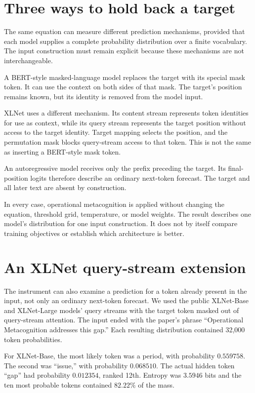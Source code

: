 \documentclass[11pt,a4paper]{article}
\begin{document}
\section{Three ways to hold back a target}
The same equation can measure different prediction mechanisms, provided that each model supplies a complete probability distribution over a finite vocabulary. The input construction must remain explicit because these mechanisms are not interchangeable.

A BERT-style masked-language model replaces the target with its special mask token. It can use the context on both sides of that mask. The target's position remains known, but its identity is removed from the model input.

XLNet uses a different mechanism. Its content stream represents token identities for use as context, while its query stream represents the target position without access to the target identity. Target mapping selects the position, and the permutation mask blocks query-stream access to that token. This is not the same as inserting a BERT-style mask token.

An autoregressive model receives only the prefix preceding the target. Its final-position logits therefore describe an ordinary next-token forecast. The target and all later text are absent by construction.

In every case, operational metacognition is applied without changing the equation, threshold grid, temperature, or model weights. The result describes one model's distribution for one input construction. It does not by itself compare training objectives or establish which architecture is better.

\section{An XLNet query-stream extension}
The instrument can also examine a prediction for a token already present in the input, not only an ordinary next-token forecast. We used the public XLNet-Base and XLNet-Large models' query streams with the target token masked out of query-stream attention. The input ended with the paper's phrase ``Operational Metacognition addresses this gap.'' Each resulting distribution contained 32,000 token probabilities.

For XLNet-Base, the most likely token was a period, with probability $0.559758$. The second was ``issue,'' with probability $0.068510$. The actual hidden token ``gap'' had probability $0.012354$, ranked 12th. Entropy was $3.5946$ bits and the ten most probable tokens contained $82.22\%$ of the mass.
\end{document}
